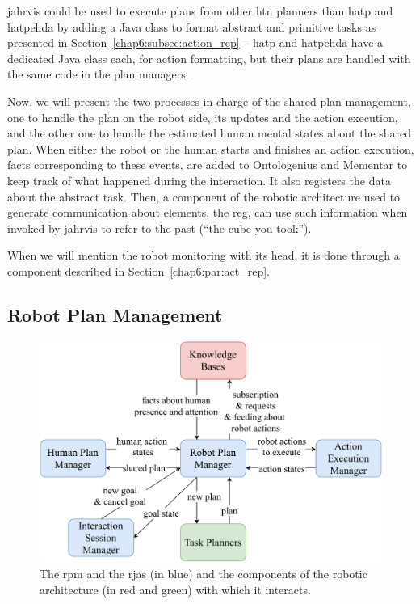 \documentclass[a4paper,11pt,twoside]{StyleThese}
\begin{document}
\bigskip
\acrshort{jahrvis} could be used to execute plans from other \acrshort{htn} planners than \acrshort{hatp} and \acrshort{hatpehda} by adding a Java class to format abstract and primitive tasks as presented in Section~\ref{chap6:subsec:action_rep} -- \acrshort{hatp} and \acrshort{hatpehda} have a dedicated Java class each, for action formatting, but their plans are handled with the same code in the plan managers.

Now, we will present the two processes in charge of the shared plan management, one to handle the plan on the robot side, \ie its updates and the action execution, and the other one to handle the estimated human mental states about the shared plan. When either the robot or the human starts and finishes an action execution, facts corresponding to these events, are added to Ontologenius and Mementar to keep track of what happened during the interaction. It also registers the data about the abstract task. Then, a component of the robotic architecture used to generate communication about elements, the \acrfull{reg}, can use such information when invoked by \acrshort{jahrvis} to refer to the past (\eg ``the cube you took'').

When we will mention the robot monitoring with its head, it is done through a component described in Section~\ref{chap6:par:act_rep}.



\subsection{Robot Plan Management}\label{chap6:subsec:robot_plan}

\begin{figure}[!hbt]
	\centering
	\includegraphics[width=0.85\linewidth]{figures/chapter2/robot_manager_zoom.pdf}
	\caption{The \acrlong{rpm} and the \acrshort{rja}s (in blue) and the components of the robotic architecture (in red and green) with which it interacts.}
	\label{chap6:fig:rob_manager_zoom}
\end{figure}
\end{document}
